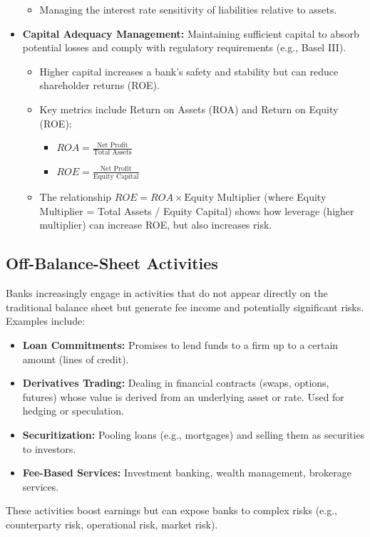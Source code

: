 \begin{itemize}
\begin{itemize}
        \item Managing the interest rate sensitivity of liabilities relative to assets.
    \end{itemize}
    \item \textbf{Capital Adequacy Management:} Maintaining sufficient capital to absorb potential losses and comply with regulatory requirements (e.g., Basel III).
    \begin{itemize}
        \item Higher capital increases a bank's safety and stability but can reduce shareholder returns (ROE).
        \item Key metrics include Return on Assets (ROA) and Return on Equity (ROE):
            \begin{itemize}
                \item $ROA = \frac{\text{Net Profit}}{\text{Total Assets}}$
                \item $ROE = \frac{\text{Net Profit}}{\text{Equity Capital}}$
            \end{itemize}
        \item The relationship $ROE = ROA \times \text{Equity Multiplier}$ (where Equity Multiplier = Total Assets / Equity Capital) shows how leverage (higher multiplier) can increase ROE, but also increases risk.
    \end{itemize}
\end{itemize}

\subsection{Off-Balance-Sheet Activities}

Banks increasingly engage in activities that do not appear directly on the traditional balance sheet but generate fee income and potentially significant risks. Examples include:
\begin{itemize}
    \item \textbf{Loan Commitments:} Promises to lend funds to a firm up to a certain amount (lines of credit).
    \item \textbf{Derivatives Trading:} Dealing in financial contracts (swaps, options, futures) whose value is derived from an underlying asset or rate. Used for hedging or speculation.
    \item \textbf{Securitization:} Pooling loans (e.g., mortgages) and selling them as securities to investors.
    \item \textbf{Fee-Based Services:} Investment banking, wealth management, brokerage services.
\end{itemize}
These activities boost earnings but can expose banks to complex risks (e.g., counterparty risk, operational risk, market risk).


